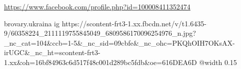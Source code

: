  
 
 
 
 

\url{https://www.facebook.com/profile.php?id=100008411352474}\par
brovary.ukraina
\ifcmt
  ig https://scontent-frt3-1.xx.fbcdn.net/v/t1.6435-9/60358224_2111119755845049_6809586170096254976_n.jpg?_nc_cat=104&ccb=1-5&_nc_sid=09cbfe&_nc_ohc=PKQhOIH7OKsAX-irUGC&_nc_ht=scontent-frt3-1.xx&oh=16bf84963c6d517f48c001d289bc5fdb&oe=616DEA6D
  @width 0.15
\fi

